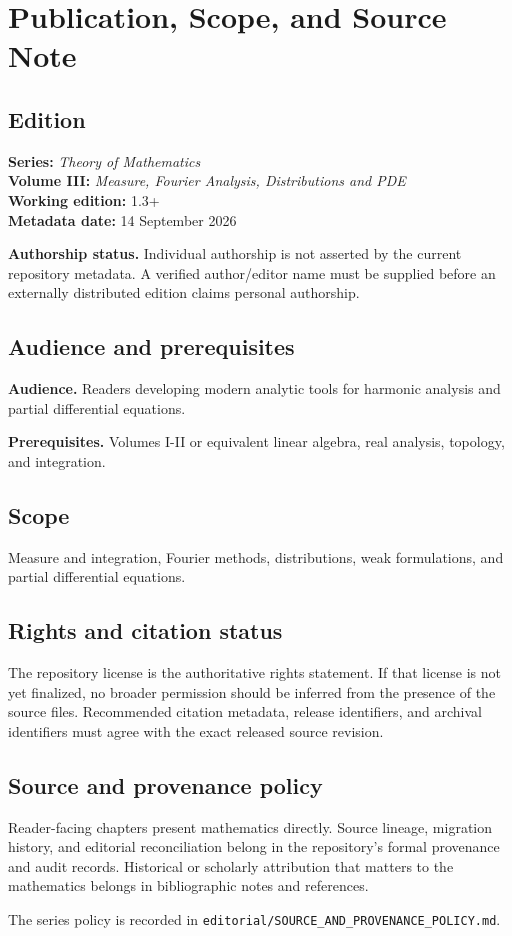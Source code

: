 \chapter*{Publication, Scope, and Source Note}
{}

\section*{Edition}
\textbf{Series:} \emph{Theory of Mathematics}\\
\textbf{Volume III:} \emph{Measure, Fourier Analysis, Distributions and PDE}\\
\textbf{Working edition:} 1.3+\\
\textbf{Metadata date:} 14 September 2026

\textbf{Authorship status.} Individual authorship is not asserted by the current repository metadata. A verified author/editor name must be supplied before an externally distributed edition claims personal authorship.

\section*{Audience and prerequisites}
\textbf{Audience.} Readers developing modern analytic tools for harmonic analysis and partial differential equations.

\textbf{Prerequisites.} Volumes I-II or equivalent linear algebra, real analysis, topology, and integration.

\section*{Scope}
Measure and integration, Fourier methods, distributions, weak formulations, and partial differential equations.

\section*{Rights and citation status}
The repository license is the authoritative rights statement. If that license is
not yet finalized, no broader permission should be inferred from the presence of
the source files. Recommended citation metadata, release identifiers, and
archival identifiers must agree with the exact released source revision.

\section*{Source and provenance policy}
Reader-facing chapters present mathematics directly. Source lineage, migration
history, and editorial reconciliation belong in the repository's formal
provenance and audit records. Historical or scholarly attribution that matters
to the mathematics belongs in bibliographic notes and references.

The series policy is recorded in
\texttt{editorial/SOURCE\_AND\_PROVENANCE\_POLICY.md}.
